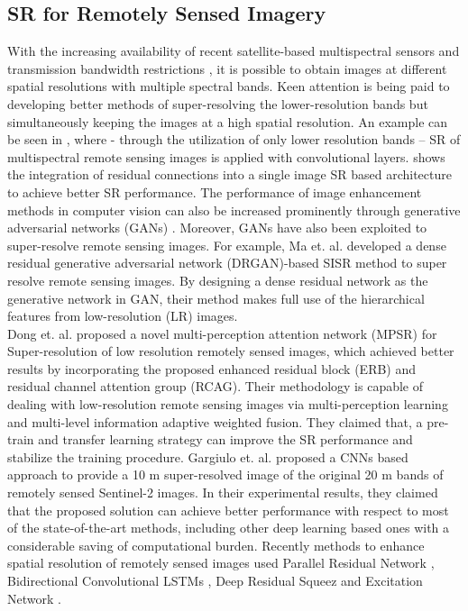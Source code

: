 \documentclass[journal]{IEEEtran}
\begin{document}
\subsection{SR for Remotely Sensed Imagery}
With the increasing availability of recent satellite-based multispectral sensors and transmission bandwidth restrictions \cite{lanaras2018super}, it is possible to obtain images at different spatial resolutions with multiple spectral bands. Keen attention is being paid to developing better methods of super-resolving the lower-resolution bands but simultaneously keeping the images at a high spatial resolution. An example can be seen in \cite{liebel2016single}, where - through the utilization of only lower resolution bands – SR of multispectral remote sensing images is applied with convolutional layers. \cite{lei2017super} shows the integration of residual connections into a single image SR based architecture to achieve better SR performance. The performance of image enhancement methods in computer vision can also be increased prominently through generative adversarial networks (GANs) \cite{ledig2017photo,wang2018esrgan}. Moreover,  GANs have also been exploited to super-resolve remote sensing images. For example, Ma et. al. \cite{ma2019super} developed a dense residual generative adversarial network (DRGAN)-based SISR method to super resolve remote sensing images.  By designing a dense residual network as the generative network in GAN, their method makes full use of the hierarchical features from low-resolution (LR) images. \\
Dong et. al. \cite{dong2019transferred} proposed a novel multi-perception attention network (MPSR) for Super-resolution of low resolution remotely sensed images, which achieved better results by incorporating the proposed enhanced residual block (ERB) and residual channel attention group (RCAG). Their methodology is capable of dealing with low-resolution remote sensing images via multi-perception learning and multi-level information adaptive weighted fusion. They claimed that, a pre-train and transfer learning strategy can improve the SR performance and stabilize the training procedure. Gargiulo et. al. \cite{gargiulo2019fast} proposed a CNNs based approach to provide a 10 m super-resolved image of the original 20 m bands of remotely sensed Sentinel-2 images. In their experimental results,  they claimed  that the proposed solution can achieve better performance with respect to most of the state-of-the-art methods, including other deep learning based ones with a considerable saving of computational burden. Recently methods to enhance spatial resolution of remotely sensed images used Parallel Residual Network \cite{wu2020sentinel}, Bidirectional Convolutional LSTMs \cite{chang2019bidirectional}, Deep Residual Squeez and Excitation Network \cite{gu2019deep}.
\end{document}
